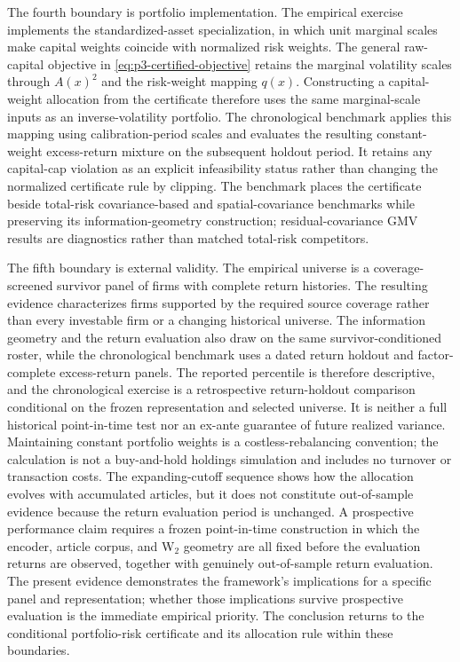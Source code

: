 The fourth boundary is portfolio implementation.
The empirical exercise implements the standardized-asset specialization, in
which unit marginal scales make capital weights coincide with normalized risk
weights.
The general raw-capital objective in \eqref{eq:p3-certified-objective}
retains the marginal volatility scales through $A(x)^2$ and the risk-weight
mapping $q(x)$.
Constructing a capital-weight allocation from the certificate therefore uses
the same marginal-scale inputs as an inverse-volatility portfolio.
The chronological benchmark applies this mapping using calibration-period
scales and evaluates the resulting constant-weight excess-return mixture on
the subsequent holdout period. It retains any capital-cap violation as an
explicit infeasibility status rather than changing the normalized certificate
rule by clipping. The benchmark places the certificate beside total-risk
covariance-based and spatial-covariance benchmarks while preserving its
information-geometry construction; residual-covariance GMV results are
diagnostics rather than matched total-risk competitors.

The fifth boundary is external validity.
The empirical universe is a coverage-screened survivor panel of
 firms with complete return histories.
The resulting evidence characterizes firms supported by the required source
coverage rather than every investable firm or a changing historical universe.
The information geometry and the return evaluation also draw on the same
survivor-conditioned roster, while the chronological benchmark uses a dated
return holdout and factor-complete excess-return panels.
The reported percentile is therefore descriptive, and the chronological
exercise is a retrospective return-holdout comparison conditional on the
frozen representation and selected universe. It is neither a full historical
point-in-time test nor an ex-ante guarantee of future realized variance.
Maintaining constant portfolio weights is a costless-rebalancing convention;
the calculation is not a buy-and-hold holdings simulation and includes no
turnover or transaction costs.
The expanding-cutoff sequence shows how the allocation evolves with
accumulated articles, but it does not constitute out-of-sample evidence
because the return evaluation period is unchanged.
A prospective performance claim requires a frozen point-in-time construction
in which the encoder, article corpus, and W$_2$ geometry are all fixed before
the evaluation returns are observed, together with genuinely out-of-sample
return evaluation.
The present evidence demonstrates the framework's implications for a specific
panel and representation; whether those implications survive prospective
evaluation is the immediate empirical priority.
The conclusion returns to the conditional portfolio-risk certificate and its
allocation rule within these boundaries.
